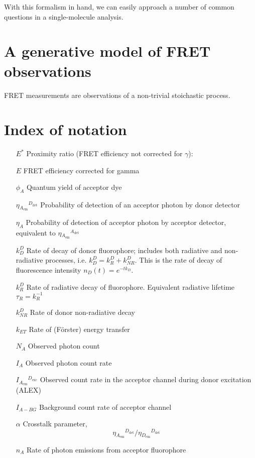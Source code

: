 \documentclass{article}
\newcommand{\emm}[1]{\ensuremath{_{#1_\mathrm{em}}}}   %
\newcommand{\exc}[1]{\ensuremath{^{#1_\mathrm{exc}}}}  %
\newcommand{\dt}[1]{\ensuremath{^{#1_\mathrm{det}}}}   %
\newcommand{\I}[2]{\ensuremath{I\emm{#1}\exc{#2}}}
\newcommand{\NR}{\ensuremath{\mathit{NR}}}          %
\newcommand{\ET}{\ensuremath{\mathit{ET}}}          %
\begin{document}
With this formalism in hand, we can easily approach a number of common
questions in a single-molecule analysis.


\section{A generative model of FRET observations}

FRET measurements are observations of a non-trivial stoichastic process.

\section{Index of notation}

\begin{enumerate}
\item[$E^*$] Proximity ratio (FRET efficiency not corrected for $\gamma$):
\item[$E$] FRET efficiency corrected for gamma
\item[$\phi_{A}$] Quantum yield of acceptor dye
\item[$\eta\emm{A}\dt{D}$] Probability of detection of an acceptor photon by donor detector
\item[$\eta_A$] Probability of detection of acceptor photon by acceptor detector, equivalent to $\eta\emm{A}\dt{A}$
\item[$k^D_D$] Rate of decay of donor fluorophore; includes both radiative and non-radiative processes, i.e. $k^D_D = k^D_R + k^D_\NR$. This is the rate of decay of fluorescence intensity $n_D(t) = e^{-t k_D}$.
\item[$k^D_R$] Rate of radiative decay of fluorophore. Equivalent radiative lifetime $\tau_R = k_R^{-1}$
\item[$k^D_\NR$] Rate of donor non-radiative decay
\item[$k_\ET$] Rate of (F\"orster) energy transfer
\item[$N_A$] Observed photon count
\item[$I_A$] Observed photon count rate
\item[$\I{A}{D}$] Observed count rate in the acceptor channel during donor excitation (ALEX)
\item[$I_{A-BG}$] Background count rate of acceptor channel
\item[$\alpha$] Crosstalk parameter, \[ \eta\emm{A}\dt{D} / \eta\emm{D}\dt{D} \]
\item[$n_A$] Rate of photon emissions from acceptor fluorophore
\end{enumerate}
\end{document}
